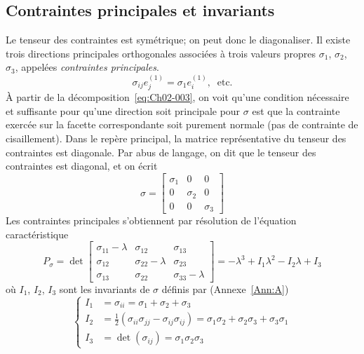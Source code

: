 \subsection{Contraintes principales et invariants} \label{ssec:Ch02-1.2}
Le tenseur des contraintes est symétrique; on peut donc le diagonaliser.
Il existe trois directions principales orthogonales associées à trois valeurs propres $\sigma_1$, $\sigma_2$, $\sigma_3$,  appelées \emph{contraintes principales}.
\begin{equation}
    \sigma_{ij} e_j^{(1)} = \sigma_1 e_i^{(1)},\ \text{ etc.}
    \label{eq:Ch02-008}
\end{equation}
À partir de la décomposition~\eqref{eq:Ch02-003}, on voit qu'une condition nécessaire et suffisante pour qu'une direction soit principale pour $\mathbb{\sigma}$ est que la contrainte exercée sur la facette correspondante soit purement normale (pas de contrainte de cisaillement).
Dans le repère principal, la matrice représentative du tenseur des contraintes est diagonale.
Par abus de langage, on dit que le tenseur des contraintes est diagonal, et on écrit
\begin{equation}
    \mathbb{\sigma} = 
    \begin{bmatrix}
        \sigma_1 & 0 & 0 \\
        0 & \sigma_2 & 0 \\
        0 & 0 & \sigma_3
    \end{bmatrix}
    \label{eq:Ch02-009}
\end{equation}
Les contraintes principales s'obtiennent par résolution de l'équation caractéristique 
\begin{equation}
    P_{\mathbb{\sigma}}  = \det
    \begin{bmatrix}
        \sigma_{11}-\lambda & \sigma_{12} & \sigma_{13}\\
        \sigma_{12} & \sigma_{22}-\lambda & \sigma_{23}\\
        \sigma_{13} & \sigma_{22} & \sigma_{33}-\lambda
    \end{bmatrix}  = -\lambda^3 + I_1 \lambda^2 - I_2 \lambda + I_3
    \label{eq:Ch02-010}
\end{equation}
où $I_1$, $I_2$, $I_3$	sont les invariants de $\mathbb{\sigma}$ définis par (Annexe~\ref{Ann:A})
\begin{equation}
    \left\{
    \begin{aligned}
        I_1 &= \sigma_{ii}= \sigma_1 + \sigma_2 + \sigma_3\\
        I_2 &= \frac{1}{2}\left( \sigma_{ii}\sigma_{jj} - \sigma_{ij}\sigma_{ij} \right) = \sigma_1\sigma_2 + \sigma_2\sigma_3 + \sigma_3\sigma_1\\
        I_3 &= \det \left( \sigma_{ij} \right) = \sigma_1\sigma_2\sigma_3
    \end{aligned}
    \right.
    \label{eq:Ch02-011}
\end{equation}
